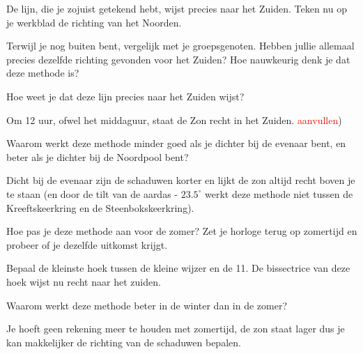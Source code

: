 De lijn, die je zojuist getekend hebt, wijst precies naar het Zuiden. Teken nu op je werkblad de richting van het Noorden.

\begin{opgave}[\discussie]
    Terwijl je nog buiten bent, vergelijk met je groepsgenoten. Hebben jullie allemaal precies dezelfde richting gevonden voor het Zuiden? Hoe nauwkeurig denk je dat deze methode is?
\end{opgave}

\begin{opgave}
    Hoe weet je dat deze lijn precies naar het Zuiden wijst?
    \begin{antwoord}
        Om 12 uur, ofwel het middaguur, staat de Zon recht in het Zuiden. \textcolor{red}{aanvullen})
    \end{antwoord}
\end{opgave}

\begin{opgave}
    Waarom werkt deze methode minder goed als je dichter bij de evenaar bent, en beter als je dichter bij de Noordpool bent? 
    \begin{antwoord}
        Dicht bij de evenaar zijn de schaduwen korter en lijkt de zon altijd recht boven je te staan (en door de tilt van de aardas - $23.5^{\circ}$ werkt deze methode niet tussen de Kreeftskeerkring en de Steenbokskeerkring).
    \end{antwoord}
\end{opgave}

\begin{opgave}[\schaar]
    Hoe pas je deze methode aan voor de zomer? Zet je horloge terug op zomertijd en probeer of je dezelfde uitkomst krijgt.
    \begin{antwoord}
        Bepaal de kleinste hoek tussen de kleine wijzer en de 11. De bissectrice van deze hoek wijst nu recht naar het zuiden.   
    \end{antwoord}
\end{opgave}

\begin{opgave}
    Waarom werkt deze methode beter in de winter dan in de zomer? 
    \begin{antwoord}
        Je hoeft geen rekening meer te houden met zomertijd, de zon staat lager dus je kan makkelijker de richting van de schaduwen bepalen.
    \end{antwoord}
\end{opgave}

